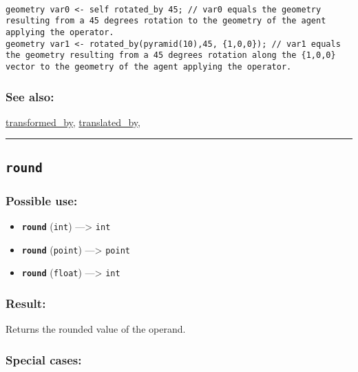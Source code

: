 \documentclass[]{book}
\providecommand{\tightlist}{%
  \setlength{\itemsep}{0pt}\setlength{\parskip}{0pt}}
\theoremstyle{definition}
\theoremstyle{definition}
\theoremstyle{definition}
\theoremstyle{remark}
\begin{document}
\begin{verbatim}
 
geometry var0 <- self rotated_by 45; // var0 equals the geometry resulting from a 45 degrees rotation to the geometry of the agent applying the operator. 
geometry var1 <- rotated_by(pyramid(10),45, {1,0,0}); // var1 equals the geometry resulting from a 45 degrees rotation along the {1,0,0} vector to the geometry of the agent applying the operator.
\end{verbatim}

\subsubsection{See also:}\label{see-also-179}

\href{OperatorsSZ\#transformed_by}{transformed\_by},
\href{OperatorsSZ\#translated_by}{translated\_by},

\begin{center}\rule{0.5\linewidth}{\linethickness}\end{center}

\subsection{\texorpdfstring{\texttt{round}}{round}}\label{round}

\subsubsection{Possible use:}\label{possible-use-445}

\begin{itemize}
\tightlist
\item
  \textbf{\texttt{round}} (\texttt{int}) ---\textgreater{} \texttt{int}
\item
  \textbf{\texttt{round}} (\texttt{point}) ---\textgreater{}
  \texttt{point}
\item
  \textbf{\texttt{round}} (\texttt{float}) ---\textgreater{}
  \texttt{int}
\end{itemize}

\subsubsection{Result:}\label{result-431}

Returns the rounded value of the operand.

\subsubsection{Special cases:}\label{special-cases-120}
\end{document}
